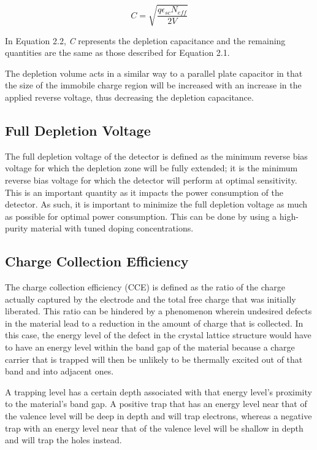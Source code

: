 \documentclass[letterpaper, 11pt]{report}
\begin{document}
\begin{equation}
C = \sqrt{\frac{q\epsilon_{sc}N_{eff}}{2V}}
\end{equation}


In Equation 2.2, \textit{C} represents the depletion capacitance and the remaining quantities are the same as those described for Equation 2.1.  

The depletion volume acts in a similar way to a parallel plate capacitor in that the size of the immobile charge region will be increased with an increase in the applied reverse voltage, thus decreasing the depletion capacitance.

\subsection{Full Depletion Voltage}

The full depletion voltage of the detector is defined as the minimum reverse bias voltage for which the depletion zone will be fully extended; it is the minimum reverse bias voltage for which the detector will perform at optimal sensitivity.  This is an important quantity as it impacts the power consumption of the detector.  As such, it is important to minimize the full depletion voltage as much as possible for optimal power consumption. This can be done by using a high-purity material with tuned doping concentrations.

\subsection{Charge Collection Efficiency}
The charge collection efficiency (CCE) is defined as the ratio of the charge actually captured by the electrode and the total free charge that was initially liberated.  This ratio can be hindered by a phenomenon wherein undesired defects in the material lead to a reduction in the amount of charge that is collected.  In this case, the energy level of the defect in the crystal lattice structure would have to have an energy level within the band gap of the material because a charge carrier that is trapped will then be unlikely to be thermally excited out of that band and into adjacent ones.

A trapping level has a certain depth associated with that energy level's proximity to the material's band gap.  A positive trap that has an energy level near that of the valence level will be deep in depth and will trap electrons, whereas a negative trap with an energy level near that of the valence level will be shallow in depth and will trap the holes instead.
\end{document}
